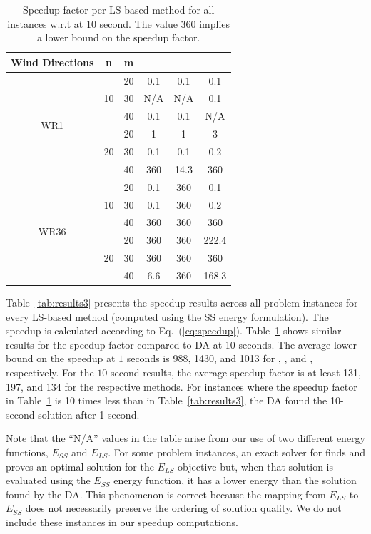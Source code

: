 \documentclass[preprint,12pt]{elsarticle}
\newcommand{\qcls}{{\sf {\small QC-LS\xspace}}}
\newcommand{\ilpls}{{\sf {\small ILP-LS\xspace}}}
\newcommand{\qclsgrb}{{\sf {\small QC-LS(GRB)\xspace}}}
\newcommand{\ilplsgrb}{{\sf {\small ILP-LS(GRB)\xspace}}}
\newcommand{\qulsgrb}{{\sf {\small QU-LS(GRB)\xspace}}}
\newcommand{\qulsda}{{\sf {\small QU-LS(DA)\xspace}}}
\begin{document}
\begin{table}[t!]
	\small
	\centering
	\begin{tabular}{| c | c | c | c | c | c | }
		\toprule
		Wind Directions  & n  & m  & \qcls &  \ilpls & \qulsgrb  \\
		\toprule
		\multirow{6}{*}{WR1}  & \multirow{3}{*}{10}  & 20 & 0.1       & 0.1 & 0.1  \\
		& & 30   & N/A & N/A & 0.1     \\
		& & 40 & 0.1 & 0.1 & N/A                \\
		\cline{2-6}
		&\multirow{3}{*}{20}   & 20  & 1  & 1  & 3         \\
		&&30   & 0.1 & 0.1  & 0.2    \\
		&&40   & 360 & 14.3  & 360        \\
		\hline
		\multirow{6}{*}{WR36} &  \multirow{3}{*}{10}    & 20 & 0.1       & 360 & 0.1  \\
		&& 30  & 0.1 & 360 & 0.2                     \\
		&& 40   & 360 & 360 & 360          \\
		\cline{2-6}
		&  \multirow{3}{*}{20}   & 20   & 360  & 360 & 222.4            \\
		&& 30   &  360  & 360 & 360                   \\
		&& 40   &  6.6  & 360 & 168.3 \\
		
		\bottomrule                   
	\end{tabular}
	
	\vspace{0.5em}
	\caption{Speedup factor per LS-based method for all instances w.r.t \qulsda{} at 10 second. The value 360 implies a lower bound on the speedup factor.}\label{tab:results4}
\end{table}
Table~\ref{tab:results3} presents the speedup results across all problem instances
for every LS-based method (computed using the SS energy formulation). The speedup is calculated according to Eq.~(\ref{eq:speedup}). Table~\ref{tab:results4} shows similar results for the speedup factor
compared to DA at 10 seconds. The average lower bound on the speedup at $1$ seconds
is 988, 1430, and 1013 for \qclsgrb, \ilplsgrb, and \qulsgrb,  respectively. For the $10$ second
results, the average
speedup factor is at least 131, 197, and 134 for the respective methods.
For instances where the speedup factor in Table~\ref{tab:results4} is 10 times less than in Table~\ref{tab:results3},
the DA found the 10-second solution after 1 second.

Note that the ``N/A'' values in the table arise from our use of two different energy functions, $E_{SS}$ and $E_{LS}$. For some problem instances, an exact solver for \qcls{} finds and proves an optimal solution for the $E_{LS}$ objective but, when that solution is evaluated using the $E_{SS}$ energy function, it has a lower energy than the solution found by the DA. This phenomenon is correct because the mapping from $E_{LS}$ to $E_{SS}$ does not necessarily preserve the ordering of solution quality. We do not include these instances in our speedup computations.  




%

\end{document}
